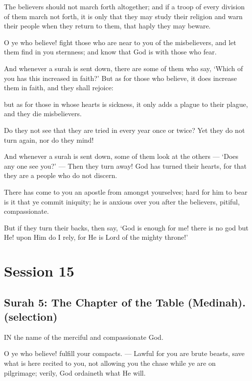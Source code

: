\documentclass[fontsize=14pt, letterpaper, notitlepage, openany, DIV=12]{scrbook} %
\begin{document}
\noindent[9:122]
The believers should not march forth altogether; and if a troop of every division of them
march not forth, it is only that they may study their religion and warn their people when they
return to them, that haply they may beware.

\noindent[9:123]
O ye who believe! fight those who are near to you of the misbelievers, and let them find
in you sternness; and know that God is with those who fear.

\noindent[9:124]
And whenever a surah is sent down, there are some of them who say, `Which of you has
this increased in faith?' But as for those who believe, it does increase them in faith, and they
shall rejoice:

\noindent[9:125]
but as for those in whose hearts is sickness, it only adds a plague to their plague, and they
die misbelievers.

\noindent[9:126]
Do they not see that they are tried in every year once or twice? Yet they do not turn
again, nor do they mind!

\noindent[9:127]
And whenever a surah is sent down, some of them look at the others --- `Does any one
see you?' --- Then they turn away! God has turned their hearts, for that they are a people who do
not discern.

\noindent[9:128]
There has come to you an apostle from amongst yourselves; hard for him to bear is it that
ye commit iniquity; he is anxious over you after the believers, pitiful, compassionate.

\noindent[9:129]
But if they turn their backs, then say, `God is enough for me! there is no god but He!
upon Him do I rely, for He is Lord of the mighty throne!'

\clearpage
\chapter{Session 15}


\section[Surah 5: The Chapter of the Table (Medinah).]{Surah 5: The Chapter of the Table (Medinah).\\ (selection)}


IN the name of the merciful and compassionate God.

\noindent[5:1]
O ye who believe! fulfill your compacts. --- Lawful for you are brute beasts, save what is
here recited to you, not allowing you the chase while ye are on pilgrimage; verily, God ordaineth
what He will.
\end{document}
